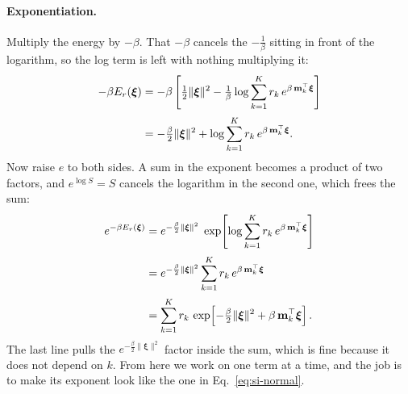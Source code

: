 \paragraph{Exponentiation.}
Multiply the energy by $-\beta$. That $-\beta$ cancels the $-\tfrac1\beta$ sitting
in front of the logarithm, so the log term is left with nothing multiplying it:
\begin{align}
  -\beta E_r(\boldsymbol{\xi})
  &= -\beta\left[\tfrac12\lVert\boldsymbol{\xi}\rVert^2
     - \tfrac1\beta\log\sum_{k=1}^{K} r_k\,
       e^{\beta\, \mathbf{m}_k^\top\boldsymbol{\xi}}\right]
     \notag\\[2pt]
  &= -\tfrac\beta2\lVert\boldsymbol{\xi}\rVert^2
     + \log\sum_{k=1}^{K} r_k\, e^{\beta\, \mathbf{m}_k^\top\boldsymbol{\xi}} .
\end{align}
Now raise $e$ to both sides. A sum in the exponent becomes a product of two
factors, and $e^{\log S} = S$ cancels the logarithm in the second one, which frees
the sum:
\begin{align}
  e^{-\beta E_r(\boldsymbol{\xi})}
  &= e^{-\frac\beta2\lVert\boldsymbol{\xi}\rVert^2}\;
     \exp\!\left[\log\sum_{k=1}^{K} r_k\,
       e^{\beta\, \mathbf{m}_k^\top\boldsymbol{\xi}}\right]
     \notag\\[2pt]
  &= e^{-\frac\beta2\lVert\boldsymbol{\xi}\rVert^2}
     \sum_{k=1}^{K} r_k\, e^{\beta\, \mathbf{m}_k^\top\boldsymbol{\xi}}
     \notag\\[2pt]
  &= \sum_{k=1}^{K} r_k\,
     \exp\!\left[-\tfrac\beta2\lVert\boldsymbol{\xi}\rVert^2
       + \beta\, \mathbf{m}_k^\top\boldsymbol{\xi}\right] .
\end{align}
The last line pulls the $e^{-\frac\beta2\lVert\boldsymbol{\xi}\rVert^{2}}$ factor
inside the sum, which is fine because it does not depend on $k$. From here we work
on one term at a time, and the job is to make its exponent look like the one in
Eq.~\ref{eq:si-normal}.


